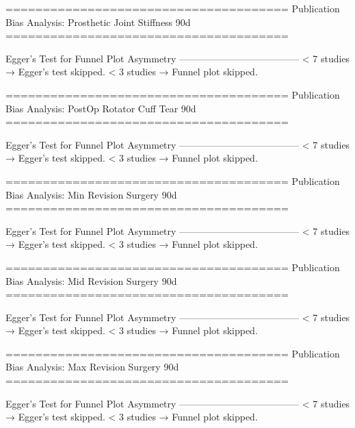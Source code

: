 ======================================
Publication Bias Analysis: Prosthetic Joint Stiffness 90d 
======================================
                                                                                                                                                        
Egger's Test for Funnel Plot Asymmetry
--------------------------------------
  < 7 studies → Egger’s test skipped.
  < 3 studies → Funnel plot skipped.

======================================
Publication Bias Analysis: PostOp Rotator Cuff Tear 90d 
======================================
                                                                                                                                                        
Egger's Test for Funnel Plot Asymmetry
--------------------------------------
  < 7 studies → Egger’s test skipped.
  < 3 studies → Funnel plot skipped.

======================================
Publication Bias Analysis: Min Revision Surgery 90d 
======================================
                                                                                                                                                        
Egger's Test for Funnel Plot Asymmetry
--------------------------------------
  < 7 studies → Egger’s test skipped.
  < 3 studies → Funnel plot skipped.

======================================
Publication Bias Analysis: Mid Revision Surgery 90d 
======================================
                                                                                                                                                        
Egger's Test for Funnel Plot Asymmetry
--------------------------------------
  < 7 studies → Egger’s test skipped.
  < 3 studies → Funnel plot skipped.

======================================
Publication Bias Analysis: Max Revision Surgery 90d 
======================================
                                                                                                                                                        
Egger's Test for Funnel Plot Asymmetry
--------------------------------------
  < 7 studies → Egger’s test skipped.
  < 3 studies → Funnel plot skipped.

